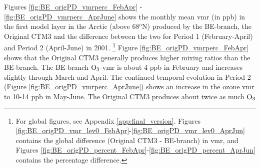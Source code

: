 








\medskip
\medskip

Figures \ref{fig:BE_origPD_vmrperc_FebApr} - \ref{fig:BE_origPD_vmrperc_AprJune} shows the monthly mean \acrshort{vmr} (in ppb) in the first model layer in the Arctic (above 68$^o$N) produced by the BE-branch, the Original CTM3 and the difference between the two for Period 1 (February-April) and Period 2 (April-June) in 2001. \footnote{For global figures, see Appendix \ref{app:final_version}. Figures \ref{fig:BE_origPD_vmr_lev0_FebApr}-\ref{fig:BE_origPD_vmr_lev0_AprJun} contains the global difference (Original CTM3 - BE-branch) in \acrshort{vmr}, and Figures \ref{fig:BE_origPD_percent_FebApr}-\ref{fig:BE_origPD_percent_AprJun} contains the percentage difference.} Figure \ref{fig:BE_origPD_vmrperc_FebApr} shows that the Original CTM3 generally produces higher mixing ratios than the BE-branch. The BE-branch $\mathrm{O_3}$-\acrshort{vmr} is about 4 ppb in February and increases slightly through March and April. The continued temporal evolution in Period 2 (Figure \ref{fig:BE_origPD_vmrperc_AprJune}) shows an increase in the ozone \acrshort{vmr} to 10-14 ppb in May-June. The Original CTM3 produces about twice as much $\mathrm{O_3}$









